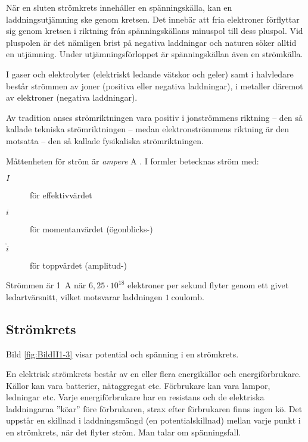 När en sluten strömkrets innehåller en spänningskälla, kan en
laddningsutjämning ske genom kretsen.
Det innebär att fria elektroner förflyttar sig genom kretsen i riktning från
spänningskällans minuspol till dess pluspol.
Vid pluspolen är det nämligen brist på negativa laddningar och naturen söker
alltid en utjämning.
Under utjämningsförloppet är spänningskällan även en strömkälla.

I gaser och elektrolyter (elektriskt ledande vätskor och geler) samt i
halvledare består strömmen av joner (positiva eller negativa laddningar),
i metaller däremot av elektroner (negativa laddningar).

Av tradition anses strömriktningen vara positiv i jonströmmens riktning -- den
så kallade tekniska strömriktningen -- medan elektronströmmens riktning är den
motsatta -- den så kallade fysikaliska strömriktningen.

Måttenheten för ström är \emph{ampere} \(\mathrm{A}\) \cite{SIbrochure8}.
I formler betecknas ström med:

\begin{description}
\item[\(I\)] för effektivvärdet
\item[\(i\)] för momentanvärdet (ögonblicks-)
\item[\(\hat{i}\)] för toppvärdet (amplitud-)
\end{description}

Strömmen är \SI{1}{\ampere} när \(6,25 \cdot 10^{18}\) elektroner per sekund
flyter genom ett givet ledartvärsnitt, vilket motsvarar laddningen
\(1\ \mathrm{coulomb}\).

\subsection{Strömkrets}
\frdjp
{}
\label{strömkrets}


Bild \ref{fig:BildII1-3} visar potential och spänning i en strömkrets.

En elektrisk strömkrets består av en eller flera energikällor och
energiförbrukare.
Källor kan vara batterier, nätaggregat etc.
Förbrukare kan vara lampor, ledningar etc.
Varje energiförbrukare har en resistans och de elektriska laddningarna ''köar''
före förbrukaren, strax efter förbrukaren finns ingen kö.
Det uppstår en skillnad i laddningsmängd (en potentialskillnad) mellan varje
punkt i en strömkrets, när det flyter ström.
Man talar om spänningsfall.

